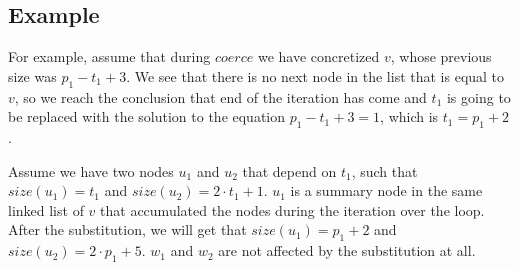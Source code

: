\subsection*{Example}
For example, assume that during $coerce$ we have concretized $v$, whose previous size was $p_1-t_1+3$. We see that there is no next node in the list that is equal to $v$, so we reach the conclusion that end of the iteration has come and $t_1$ is going to be replaced with the solution to the equation $p_1-t_1+3=1$, which is $t_1=p_1+2$.

Assume we have two nodes $u_1$ and $u_2$ that depend on $t_1$, such that $size(u_1)=t_1$ and $size(u_2)=2\cdot t_1+1$. $u_1$ is a summary node in the same linked list of $v$ that accumulated the nodes during the iteration over the loop. After the substitution, we will get that $size(u_1)=p_1+2$ and $size(u_2)=2\cdot p_1+5$. $w_1$ and $w_2$ are not affected by the substitution at all.

